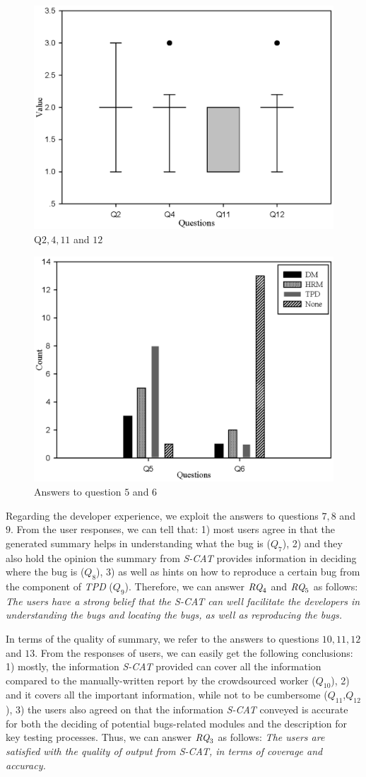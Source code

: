 \documentclass[10pt,conference]{IEEEtran}
\begin{document}
\begin{figure}[!htbp]
\centering
\includegraphics[width=0.63\columnwidth]{Figure/lowanswer}
\caption{Q$2, 4, 11$ and $12$}
\label{fig:low}
\end{figure}


\begin{figure}[!htbp]
\centering
\includegraphics[width=0.63\columnwidth]{Figure/openanswer}
\caption{Answers to question $5$ and $6$}
\label{fig:open}
\end{figure}


Regarding the developer experience, we exploit the answers to questions $7, 8$ and $9$.
From the user responses, we can tell that: 1) most users agree in that the generated summary helps in
understanding what the bug is ($Q_7$), 2) and they also hold the opinion the summary from \emph{S-CAT}
provides information in deciding where the bug is ($Q_8$), 3) as well as hints on how to reproduce a
certain bug from the component of \emph{TPD} ($Q_9$).
Therefore, we can answer $\emph{RQ}_4$ and $\emph{RQ}_5$ as follows:
\emph{The users have a strong belief that the \emph{S-CAT} can well facilitate the developers
in understanding the bugs and locating the bugs, as well as reproducing the bugs.}

In terms of the quality of summary, we refer to the answers to questions $10, 11, 12$ and $13$.
From the responses of users, we can easily get the following conclusions: 1) mostly, the information \emph{S-CAT}
provided can cover all the information compared to the manually-written report by the crowdsourced worker ($Q_{10}$),
2) and it covers all the important information, while not to be cumbersome ($Q_{11}$,$Q_{12}$), 3) the users also
agreed on that the information \emph{S-CAT} conveyed is accurate for both the deciding of potential bugs-related modules
and the description for key testing processes.
Thus, we can answer $\emph{RQ}_3$ as follows:
\emph{The users are satisfied with the quality of output from \emph{S-CAT}, in terms of coverage and accuracy.}
\end{document}
